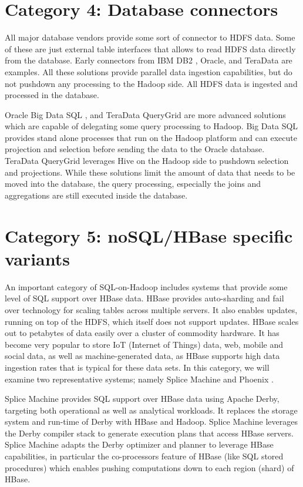 \documentclass{vldb}
\begin{document}
\section{Category 4: Database connectors}

All major database vendors provide some sort of connector to HDFS data. Some of these are just external table interfaces that allows to read HDFS data directly from the database. Early connectors from IBM DB2 \cite{ibm-sigmod2011}, Oracle, and TeraData are examples.
All these solutions provide parallel data ingestion capabilities, but do not pushdown any processing to the Hadoop side. All HDFS data is ingested and processed in the database.

Oracle Big Data SQL \cite{bigdataSQL}, and TeraData QueryGrid \cite{queryGrid} are more advanced solutions which are capable of delegating some query processing to Hadoop. Big Data SQL provides stand alone processes that run on the Hadoop platform and can execute projection and selection before sending the data to the Oracle database. TeraData QueryGrid leverages Hive on the Hadoop side to pushdown selection and projections. While these solutions limit the amount of data that needs to be moved into the database, the query processing, especially the joins and aggregations are still executed inside the database.

\section{Category 5: noSQL/HBase specific variants}

An important category of SQL-on-Hadoop includes systems that provide some level of SQL support over HBase data. HBase provides auto-sharding and fail over technology for scaling tables across multiple servers. It also enables updates, running on top of the HDFS, which itself does not support updates. HBase scales out to petabytes of data easily over a cluster of commodity hardware. It has become very popular to store IoT (Internet of Things) data, web, mobile and social data, as well as machine-generated data, as HBase supports high data ingestion rates that is typical for these data sets. In this category, we will examine two representative systems; namely Splice Machine \cite{splice} and Phoenix \cite{phoenix}. 

Splice Machine \cite{splice} provides SQL support over HBase data using Apache Derby, targeting both operational as well as analytical workloads. It replaces the storage system and run-time of Derby with HBase and Hadoop. Splice Machine leverages the Derby compiler stack to generate execution plans that access HBase servers. Splice Machine adapts the Derby optimizer and planner to leverage HBase capabilities, in particular the co-processors feature of HBase 
(like SQL stored procedures) which enables pushing computations 
down to each region (shard) of HBase.
\end{document}
